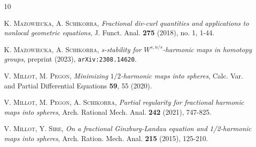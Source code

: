 \documentclass[12pt, a4paper]{article}
\newcommand{\sph}{\mathbb{S}}
\renewcommand{\(}{\left(}
\renewcommand{\)}{\right)}
\begin{document}
\begin{thebibliography}{10}


 \textsc{K. Mazowiecka, A. Schikorra}, \emph{Fractional div-curl quantities and applications to nonlocal geometric equations}, J. Funct. Anal. \textbf{275} (2018), no. 1, 1-44.


 \textsc{K. Mazowiecka, A. Schikorra}, \emph{s-stability for $W^{s,n/s}$-harmonic maps in homotopy groups}, preprint (2023), \texttt{arXiv:2308.14620}.


 \textsc{V. Millot, M. Pegon}, \emph{Minimizing $1/2$-harmonic maps into spheres}, Calc. Var. and Partial Differential Equations \textbf{59}, 55 (2020).

 \textsc{V. Millot, M. Pegon, A. Schikorra}, \emph{Partial regularity for fractional harmonic maps into spheres}, Arch. Rational Mech. Anal. \textbf{242} (2021), 747-825.

 \textsc{V. Millot, Y. Sire}, \emph{On a fractional Ginzburg-Landau equation and 1/2-harmonic maps into spheres}, Arch. Ration. Mech. Anal. \textbf{215} (2015), 125-210.





\end{thebibliography}
\end{document}

